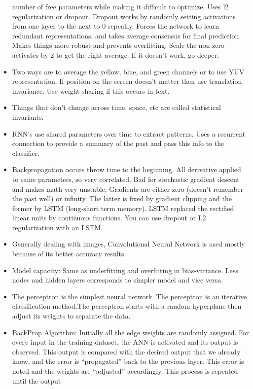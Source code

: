 \documentclass[]{book}
\begin{document}
\begin{itemize}
  number of free parameters while making it difficult to optimize. Uses
  l2 regularization or dropout. Dropout works by randomly setting
  activations from one layer to the next to 0 repeatly. Forces the
  network to learn redundant representations, and takes average
  consensus for final prediction. Makes things more robust and prevents
  overfitting. Scale the non-zero activates by 2 to get the right
  average. If it doesn't work, go deeper.
\item
  Two ways are to average the yellow, blue, and green channels or to use
  YUV representation. If position on the screen doesn't matter then use
  translation invariance. Use weight sharing if this occurs in text.
\item
  Things that don't chnage across time, space, etc are called
  statistical invariants.
\item
  RNN's use shared parameters over time to extract patterns. Uses a
  recurrent connection to provide a summary of the past and pass this
  info to the classifier.
\item
  Backpropagation occurs throw time to the beginning. All derivative
  applied to same parameters, so very correlated. Bad for stochastic
  gradient descent and makes math very unstable. Gradients are either
  zero (doesn't remember the past well) or infinity. The latter is fixed
  by gradient clipping and the former by LSTM (long-short term memory).
  LSTM replaced the rectified linear units by continuous functions. You
  can use dropout or L2 regularization with an LSTM.
\item
  Generally dealing with images, Convolutional Neural Network is used
  mostly because of its better accuracy results.
\item
  Model capacity: Same as underfitting and overfitting in bias-variance.
  Less nodes and hidden layers corresponds to simpler model and vice
  versa.
\item
  The perceptron is the simplest neural network. The perceptron is an
  iterative classification method.The perceptron starts with a random
  hyperplane then adjust its weights to separate the data.
\item
  BackProp Algorithm: Initially all the edge weights are randomly
  assigned. For every input in the training dataset, the ANN is
  activated and its output is observed. This output is compared with the
  desired output that we already know, and the error is ``propagated''
  back to the previous layer. This error is noted and the weights are
  ``adjusted'' accordingly. This process is repeated until the output

\end{itemize}
\end{document}
